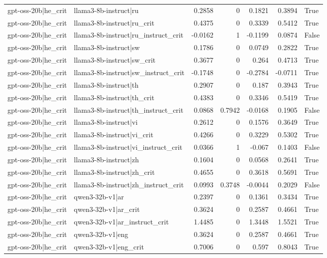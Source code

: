 \begin{table}
\begin{tabular}{l l r r r r l}
gpt-oss-20b|he_crit & llama3-8b-instruct|ru & 0.2858 & 0 & 0.1821 & 0.3894 & True \\
gpt-oss-20b|he_crit & llama3-8b-instruct|ru_crit & 0.4375 & 0 & 0.3339 & 0.5412 & True \\
gpt-oss-20b|he_crit & llama3-8b-instruct|ru_instruct_crit & -0.0162 & 1 & -0.1199 & 0.0874 & False \\
gpt-oss-20b|he_crit & llama3-8b-instruct|sw & 0.1786 & 0 & 0.0749 & 0.2822 & True \\
gpt-oss-20b|he_crit & llama3-8b-instruct|sw_crit & 0.3677 & 0 & 0.264 & 0.4713 & True \\
gpt-oss-20b|he_crit & llama3-8b-instruct|sw_instruct_crit & -0.1748 & 0 & -0.2784 & -0.0711 & True \\
gpt-oss-20b|he_crit & llama3-8b-instruct|th & 0.2907 & 0 & 0.187 & 0.3943 & True \\
gpt-oss-20b|he_crit & llama3-8b-instruct|th_crit & 0.4383 & 0 & 0.3346 & 0.5419 & True \\
gpt-oss-20b|he_crit & llama3-8b-instruct|th_instruct_crit & 0.0868 & 0.7942 & -0.0168 & 0.1905 & False \\
gpt-oss-20b|he_crit & llama3-8b-instruct|vi & 0.2612 & 0 & 0.1576 & 0.3649 & True \\
gpt-oss-20b|he_crit & llama3-8b-instruct|vi_crit & 0.4266 & 0 & 0.3229 & 0.5302 & True \\
gpt-oss-20b|he_crit & llama3-8b-instruct|vi_instruct_crit & 0.0366 & 1 & -0.067 & 0.1403 & False \\
gpt-oss-20b|he_crit & llama3-8b-instruct|zh & 0.1604 & 0 & 0.0568 & 0.2641 & True \\
gpt-oss-20b|he_crit & llama3-8b-instruct|zh_crit & 0.4655 & 0 & 0.3618 & 0.5691 & True \\
gpt-oss-20b|he_crit & llama3-8b-instruct|zh_instruct_crit & 0.0993 & 0.3748 & -0.0044 & 0.2029 & False \\
gpt-oss-20b|he_crit & qwen3-32b-v1|ar & 0.2397 & 0 & 0.1361 & 0.3434 & True \\
gpt-oss-20b|he_crit & qwen3-32b-v1|ar_crit & 0.3624 & 0 & 0.2587 & 0.4661 & True \\
gpt-oss-20b|he_crit & qwen3-32b-v1|ar_instruct_crit & 1.4485 & 0 & 1.3448 & 1.5521 & True \\
gpt-oss-20b|he_crit & qwen3-32b-v1|eng & 0.3624 & 0 & 0.2587 & 0.4661 & True \\
gpt-oss-20b|he_crit & qwen3-32b-v1|eng_crit & 0.7006 & 0 & 0.597 & 0.8043 & True \\

\end{tabular}
\end{table}
